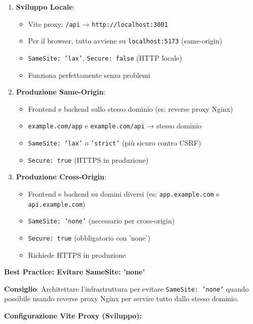 \documentclass[11pt,a4paper]{article}
\newcommand{\code}[1]{\texttt{#1}}
\newcommand{\important}[1]{\textcolor{red!80!black}{\textbf{#1}}}
\begin{document}
\begin{enumerate}
    \item \textbf{Sviluppo Locale}:
        \begin{itemize}
            \item Vite proxy: \code{/api} → \code{http://localhost:3001}
            \item Per il browser, tutto avviene su \code{localhost:5173} (same-origin)
            \item \code{SameSite: 'lax'}, \code{Secure: false} (HTTP locale)
            \item Funziona perfettamente senza problemi
        \end{itemize}
    
    \item \textbf{Produzione Same-Origin}:
        \begin{itemize}
            \item Frontend e backend sullo stesso dominio (es: reverse proxy Nginx)
            \item \code{example.com/app} e \code{example.com/api} → stesso dominio
            \item \code{SameSite: 'lax'} o \code{'strict'} (più sicuro contro CSRF)
            \item \code{Secure: true} (HTTPS in produzione)
        \end{itemize}
    
    \item \textbf{Produzione Cross-Origin}:
        \begin{itemize}
            \item Frontend e backend su domini diversi (es: \code{app.example.com} e \code{api.example.com})
            \item \code{SameSite: 'none'} (necessario per cross-origin)
            \item \code{Secure: true} (obbligatorio con 'none')
            \item Richiede HTTPS in produzione
        \end{itemize}
\end{enumerate}

\textbf{Best Practice: Evitare SameSite: 'none'}

\important{Consiglio}: Architettare l'infrastruttura per evitare \code{SameSite: 'none'} quando possibile usando reverse proxy Nginx per servire tutto dallo stesso dominio.

\textbf{Configurazione Vite Proxy (Sviluppo):}
\end{document}
